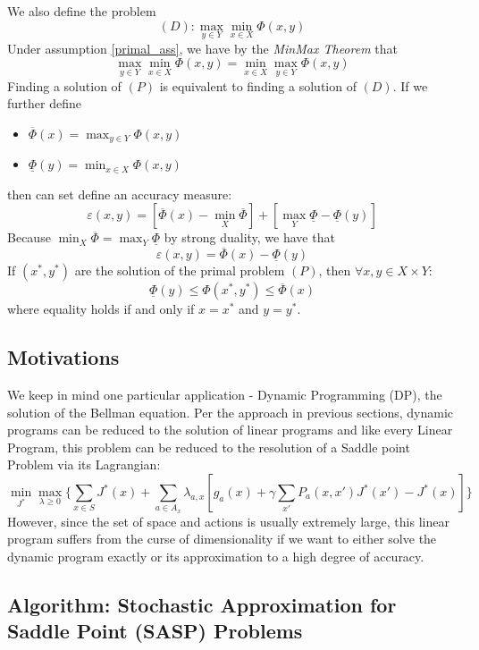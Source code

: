 \documentclass[12pt,reqno]{amsart}
\numberwithin{equation}{section}
\begin{document}
We also define the  problem
$$
(D): \max_{y \in Y}\min_{x \in X} \Phi(x,y)
$$
Under assumption \ref{primal_ass}, we have by the \emph{MinMax Theorem} that 
$$
\max_{y \in Y}\min_{x \in X} \Phi(x,y) = \min_{x \in X}\max_{y \in Y} \Phi(x,y)
$$
Finding a solution of $(P)$ is equivalent to finding a solution of $(D)$. If we further define
\begin{itemize}
\item $\overline{\Phi}(x) = \max_{y \in Y}\Phi(x,y)$
\item $\underline{\Phi}(y) = \min_{x \in X}\Phi(x,y)$
\end{itemize}
then can set define  an accuracy measure:
$$
\varepsilon(x,y) = [\overline{\Phi}(x) - \min_{X}\overline{\Phi}] + [\max_{Y}\underline{\Phi} - \underline{\Phi}(y)]
$$
Because $\min_{X}\overline{\Phi} = \max_{Y}\underline{\Phi}$ by strong duality, we have that
$$
\varepsilon(x,y) = \overline{\Phi}(x) - \underline{\Phi}(y)
$$
If $(x^{*},y^{*})$ are the solution of the primal problem $(P)$, then $\forall x, y \in X \times Y$:
$$
\underline{\Phi}(y) \leq \Phi(x^{*},y^{*}) \leq \overline{\Phi}(x)
$$
where equality holds if and only if $x = x^{*}$ and $y = y^{*}$.

\subsection{Motivations}

We keep in mind one particular application - Dynamic Programming (DP), the solution of the Bellman equation. Per the approach in previous sections, dynamic programs can be reduced to the solution of linear programs and like every Linear Program, this problem can be reduced to the resolution of a Saddle point Problem via its Lagrangian:
$$
\min_{J^{*}}\max_{\lambda \geq 0}\{ \sum_{x \in S} J^{*}(x) + \sum_{a \in A_x} \lambda_{a,x}[g_a(x) + \gamma \sum_{x'} P_a(x,x')J^{*}(x') - J^{*}(x)] \}
$$
However, since the set of space and actions is usually extremely large, this linear program suffers from the curse of dimensionality if we want to either solve the dynamic program exactly or its approximation to a high degree of accuracy.

\subsection{Algorithm: Stochastic Approximation for Saddle Point (SASP) Problems}
\end{document}
